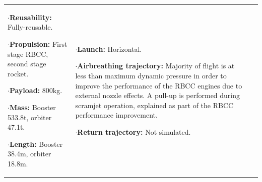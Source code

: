 {\begin{landscape}
\begin{xltabular}{\linewidth}{|X|X|X|}
	$\cdot$\textbf{Reusability:} Fully-reusable. 
	
	$\cdot$\textbf{Propulsion:} First stage RBCC, second stage rocket. 
	
	$\cdot$\textbf{Payload:} 800kg.

	 $\cdot$\textbf{Mass:} Booster 533.8t, orbiter 47.1t.
	 
	 $\cdot$\textbf{Length:} Booster 38.4m, orbiter 18.8m. 
	 
	
	&\small
	
	$\cdot$\textbf{Launch:} Horizontal. 
	
	$\cdot$\textbf{Airbreathing trajectory:} Majority of flight is at less than maximum dynamic pressure in order to improve the performance of the RBCC engines due to external nozzle effects. A pull-up is performed during scramjet operation, explained as part of the RBCC performance improvement.

	
	$\cdot$\textbf{Return trajectory:} Not simulated. 
	

\end{xltabular}
\end{landscape}}
